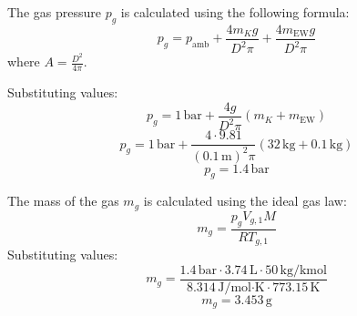 The gas pressure \( p_g \) is calculated using the following formula:  
\[
p_g = p_{\text{amb}} + \frac{4 m_K g}{D^2 \pi} + \frac{4 m_{\text{EW}} g}{D^2 \pi}
\]
where \( A = \frac{D^2}{4 \pi} \).  

Substituting values:  
\[
p_g = 1 \, \text{bar} + \frac{4 g}{D^2 \pi} (m_K + m_{\text{EW}})
\]
\[
p_g = 1 \, \text{bar} + \frac{4 \cdot 9.81}{(0.1 \, \text{m})^2 \pi} (32 \, \text{kg} + 0.1 \, \text{kg})
\]
\[
p_g = 1.4 \, \text{bar}
\]

The mass of the gas \( m_g \) is calculated using the ideal gas law:  
\[
m_g = \frac{p_g V_{g,1} M}{R T_{g,1}}
\]
Substituting values:  
\[
m_g = \frac{1.4 \, \text{bar} \cdot 3.74 \, \text{L} \cdot 50 \, \text{kg/kmol}}{8.314 \, \text{J/mol·K} \cdot 773.15 \, \text{K}}
\]
\[
m_g = 3.453 \, \text{g}
\]